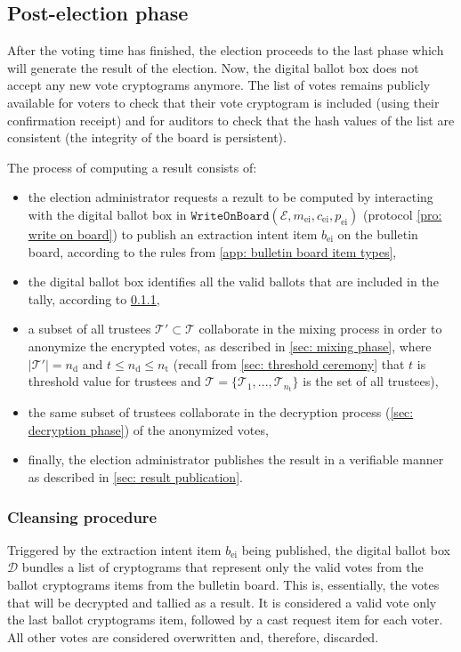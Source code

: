 \subsection{Post-election phase} \label{sec: post-election phase}
After the voting time has finished, the election proceeds to the last phase which will generate the result of the election. Now, the digital ballot box does not accept any new vote cryptograms anymore. The list of votes remains publicly available for voters to check that their vote cryptogram is included (using their confirmation receipt) and for auditors to check that the hash values of the list are consistent (the integrity of the board is persistent).

The process of computing a result consists of:
\begin{itemize}
    \item the election administrator requests a rezult to be computed by interacting with the digital ballot box in $\mathtt{WriteOnBoard}(\mathcal{E}, m_\mathrm{ei}, c_\mathrm{ei}, p_\mathrm{ei})$ (protocol \ref{pro: write on board}) to publish an extraction intent item $b_\mathrm{ei}$ on the bulletin board, according to the rules from \cref{app: bulletin board item types},
    \item the digital ballot box identifies all the valid ballots that are included in the tally, according to \cref{sec: cleansing procedure},
    \item a subset of all trustees $\boldsymbol{\mathcal{T}'} \subset \boldsymbol{\mathcal{T}}$ collaborate in the mixing process in order to anonymize the encrypted votes, as described in \cref{sec: mixing phase}, where $|\boldsymbol{\mathcal{T}'}| = n_\mathrm{d}$ and $t \leq n_\mathrm{d} \leq n_\mathrm{t}$ (recall from \cref{sec: threshold ceremony} that $t$ is threshold value for trustees and $\boldsymbol{\mathcal{T}} = \{ \mathcal{T}_1, ..., \mathcal{T}_{n_\mathrm{t}} \}$ is the set of all trustees),
    \item the same subset of trustees collaborate in the decryption process (\cref{sec: decryption phase}) of the anonymized votes,
    \item finally, the election administrator publishes the result in a verifiable manner as described in \cref{sec: result publication}.
\end{itemize}


\subsubsection{Cleansing procedure} \label{sec: cleansing procedure}
Triggered by the extraction intent item $b_\mathrm{ei}$ being published, the digital ballot box $\mathcal{D}$ bundles a list of cryptograms that represent only the valid votes from the ballot cryptograms items from the bulletin board. This is, essentially, the votes that will be decrypted and tallied as a result. It is considered a valid vote only the last ballot cryptograms item, followed by a cast request item for each voter. All other votes are considered overwritten and, therefore, discarded.

